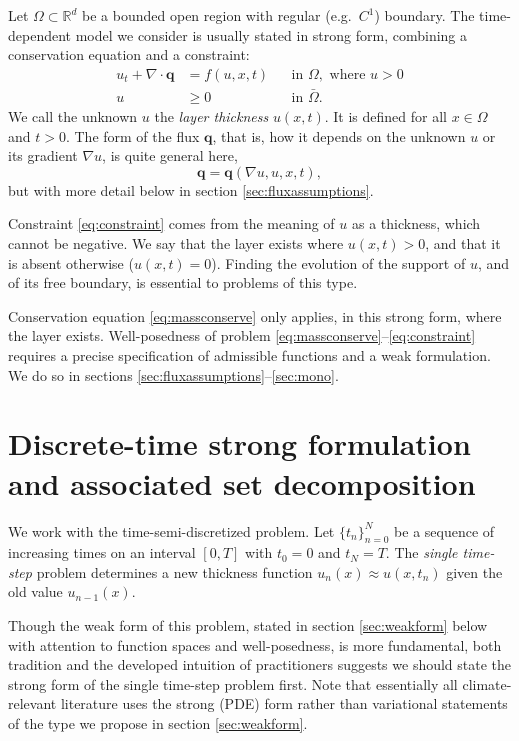 \documentclass[final,leqno,onefignum,onetabnum]{siamltex1213bueler}
\newcommand\bq{\mathbf{q}}
\newcommand{\Div}{\nabla\cdot}
\renewcommand{\grad}{\nabla}
\newcommand\RR{\mathbb{R}}
\begin{document}
Let $\Omega \subset \RR^d$ be a bounded open region with regular (e.g.~$C^1$) boundary.  The time-dependent model we consider is usually stated in strong form, combining a conservation equation and a constraint:
\begin{align}
u_t + \Div \bq &= f(u,x,t) &&\text{in } \Omega, \text{ where } u > 0 \label{eq:massconserve} \\
u &\ge 0 &&\text{in } \bar\Omega. \label{eq:constraint}
\end{align}
We call the unknown $u$ the \emph{layer thickness} $u(x,t)$.  It is defined for all $x\in \Omega$ and $t>0$.  The form of the flux $\bq$, that is, how it depends on the unknown $u$ or its gradient $\grad u$, is quite general here,
\begin{equation}
\bq = \bq(\grad u,u,x,t), \label{eq:fluxdepends}
\end{equation}
but with more detail below in section \ref{sec:fluxassumptions}.

Constraint \eqref{eq:constraint} comes from the meaning of $u$ as a thickness, which cannot be negative.  We say that the layer exists where $u(x,t)>0$, and that it is absent otherwise ($u(x,t)=0$).  Finding the evolution of the support of $u$, and of its free boundary, is essential to problems of this type.

Conservation equation \eqref{eq:massconserve} only applies, in this strong form, where the layer exists.  Well-posedness of problem \eqref{eq:massconserve}--\eqref{eq:constraint} requires a precise specification of admissible functions and a weak formulation.  We do so in sections \ref{sec:fluxassumptions}--\ref{sec:mono}.

\section{Discrete-time strong formulation and associated set decomposition}  \label{sec:discreteform}

We work with the time-semi-discretized problem.  Let $\{t_n\}_{n=0}^N$ be a sequence of increasing times on an interval $[0,T]$ with $t_0=0$ and $t_N=T$.  The \emph{single time-step} problem determines a new thickness function $u_n(x) \approx u(x,t_n)$ given the old value $u_{n-1}(x)$.

Though the weak form of this problem, stated in section \ref{sec:weakform} below with attention to function spaces and well-posedness, is more fundamental, both tradition and the developed intuition of practitioners suggests we should state the strong form of the single time-step problem first.  Note that essentially all climate-relevant literature uses the strong (PDE) form rather than variational statements of the type we propose in section \ref{sec:weakform}.
\end{document}

